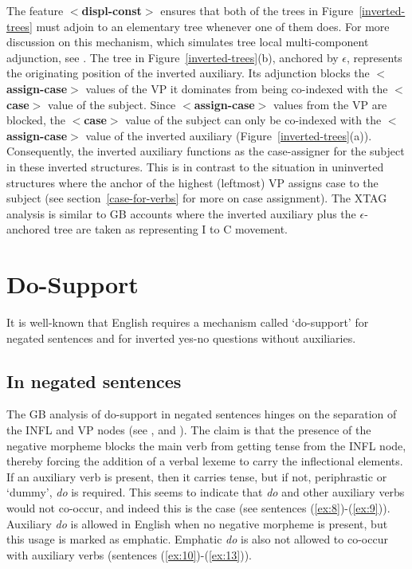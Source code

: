 The feature {\bf $<$displ-const$>$} ensures that both of the trees in 
Figure~\ref{inverted-trees} must adjoin to an elementary tree whenever one of 
them does. For more discussion on this mechanism, which simulates tree local 
multi-component adjunction, see \cite{hockeysrini93}.  The tree in 
Figure~\ref{inverted-trees}(b), anchored by $\epsilon$, represents the 
originating position of the inverted auxiliary. Its adjunction blocks the {\bf $<$assign-case$>$} values of the VP it dominates from being co-indexed with the 
{\bf $<$case$>$} value of the subject. Since {\bf $<$assign-case$>$} values 
from the VP are blocked, the {\bf $<$case$>$} value of the subject can only be 
co-indexed with the {\bf $<$assign-case$>$} value of the inverted auxiliary 
(Figure~\ref{inverted-trees}(a)).  Consequently, the inverted auxiliary 
functions as the case-assigner for the subject in these inverted structures. 
This is in contrast to the situation in uninverted structures where the anchor 
of the highest (leftmost) VP assigns case to the subject (see 
section~\ref{case-for-verbs} for more on case assignment).  The XTAG analysis 
is similar to GB accounts where the inverted auxiliary plus the 
$\epsilon$-anchored tree are taken as representing I to C movement. 
 
\section{Do-Support} 
 
It is well-known that English requires a mechanism called `do-support' for 
negated sentences and for inverted yes-no questions without auxiliaries. 
 
\beginsentences
{}\label{ex:2} 
\label{ex:3} 
\label{ex:4} 
\label{ex:5} 
\label{ex:6} 
\label{ex:7} 
\endsentences

 
\subsection{In negated sentences} 
\label{do-support-negatives} 
 
The GB analysis of do-support in negated sentences hinges on the separation of 
the INFL and VP nodes (see \cite{chomsky65}, \cite{jackendoff72} and 
\cite{chomsky86}).  The claim is that the presence of the negative morpheme 
blocks the main verb from getting tense from the INFL node, thereby forcing the 
addition of a verbal lexeme to carry the inflectional elements.  If an 
auxiliary verb is present, then it carries tense, but if not, periphrastic or 
`dummy', {\it do} is required.  This seems to indicate that {\it do} and other 
auxiliary verbs would not co-occur, and indeed this is the case (see sentences 
(\ref{ex:8})-(\ref{ex:9})).  Auxiliary {\it do} is allowed in English when no 
negative morpheme is present, but this usage is marked as emphatic.  Emphatic 
{\it do} is also not allowed to co-occur with auxiliary verbs (sentences 
(\ref{ex:10})-(\ref{ex:13})). 
 
